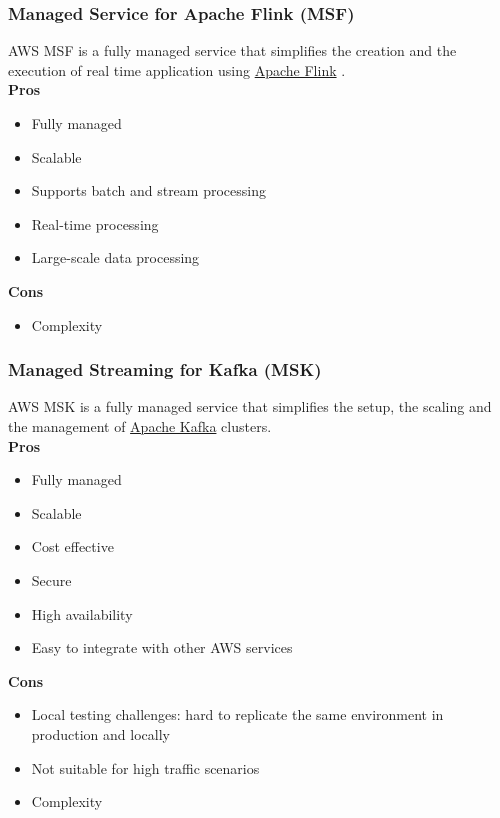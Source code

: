         \subsubsection{Managed Service for Apache Flink (MSF)}
        \label{aws:msf}
        AWS MSF is a fully managed service that simplifies the creation and the execution of real time application using \href{https://flink.apache.org/}{Apache Flink} .\\
        \textbf{Pros}
        \begin{itemize}
            \item Fully managed
            \item Scalable
            \item Supports batch and stream processing
            \item Real-time processing
            \item Large-scale data processing
        \end{itemize}
        \textbf{Cons}
        \begin{itemize}
            \item Complexity
        \end{itemize}

        \subsubsection{Managed Streaming for Kafka (MSK)}
        \label{aws:msk}
        AWS MSK is a fully managed service that simplifies the setup, the scaling and the management of \href{https://kafka.apache.org/}{Apache Kafka} clusters.\\
        \textbf{Pros}
        \begin{itemize}
            \item Fully managed
            \item Scalable
            \item Cost effective
            \item Secure
            \item High availability
            \item Easy to integrate with other AWS services
        \end{itemize}
        \textbf{Cons}
        \begin{itemize}
            \item Local testing challenges: hard to replicate the same environment in production and locally
            \item Not suitable for high traffic scenarios
            \item Complexity
        \end{itemize}

